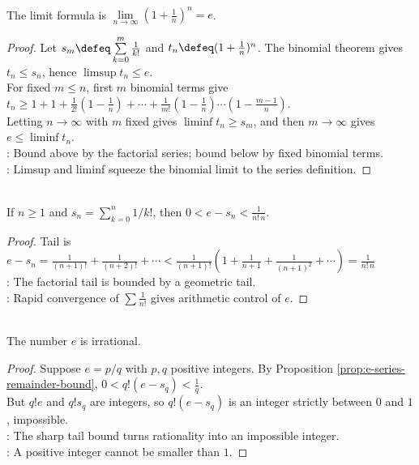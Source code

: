 \begin{theorem} \label{thm:e-as-binomial-limit} \\
The limit formula is $\lim\limits_{n\to\infty}\left(1+\frac1n\right)^n=e$.
\begin{proof}
Let $s_m\defeq\sum\limits_{k=0}^{m}\frac{1}{k!}$ and $t_n\defeq(1+\frac{1}{n})^n$. The binomial theorem gives $t_n\leq s_n$, hence $\limsup t_n\leq e$.\\
For fixed $m\leq n$, first $m$ binomial terms give $t_n\geq 1+1+\frac1{2!}\left(1-\frac1n\right)+\cdots+\frac1{m!}\left(1-\frac1n\right)\cdots\left(1-\frac{m-1}{n}\right)$.\\
Letting $n\to\infty$ with $m$ fixed gives $\liminf t_n\geq s_m$, and then $m\to\infty$ gives $e\leq\liminf t_n$.\\
: Bound above by the factorial series; bound below by fixed binomial terms.\\
: Limsup and liminf squeeze the binomial limit to the series definition.
\end{proof}
\end{theorem}

\begin{proposition} \label{prop:e-series-remainder-bound} \\
If $n\geq1$ and $s_n=\sum\limits_{k=0}^{n}1/k!$, then $0<e-s_n<\frac{1}{n!\,n}$.
\begin{proof}
Tail is $e-s_n=\frac1{(n+1)!}+\frac1{(n+2)!}+\cdots <\frac1{(n+1)!}\left(1+\frac1{n+1}+\frac1{(n+1)^2}+\cdots\right)=\frac1{n!\,n}$\\
: The factorial tail is bounded by a geometric tail.\\
: Rapid convergence of $\sum\frac{1}{n!}$ gives arithmetic control of $e$.
\end{proof}
\end{proposition}

\begin{theorem} \label{thm:e-irrational} \\
The number $e$ is irrational.
\begin{proof}
Suppose $e=p/q$ with $p,q$ positive integers. By Proposition \ref{prop:e-series-remainder-bound}, $0<q!(e-s_q)<\frac1q$.\\
But $q!e$ and $q!s_q$ are integers, so $q!(e-s_q)$ is an integer strictly between $0$ and $1$, impossible.\\
: The sharp tail bound turns rationality into an impossible integer.\\
: A positive integer cannot be smaller than $1$.
\end{proof}
\end{theorem}

